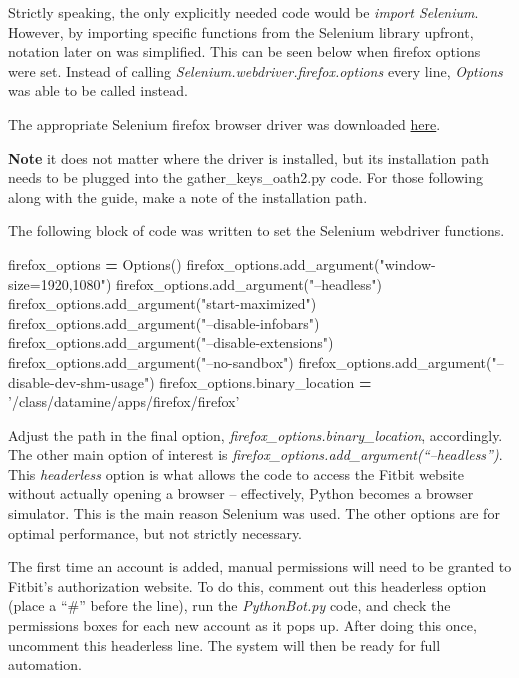 \documentclass[]{book}
\newenvironment{Shaded}{\begin{snugshade}}{\end{snugshade}}
\newcommand{\NormalTok}[1]{#1}
\newcommand{\OperatorTok}[1]{\textcolor[rgb]{0.81,0.36,0.00}{\textbf{#1}}}
\newcommand{\StringTok}[1]{\textcolor[rgb]{0.31,0.60,0.02}{#1}}
\begin{document}
Strictly speaking, the only explicitly needed code would be \emph{import Selenium}. However, by importing specific functions from the Selenium library upfront, notation later on was simplified. This can be seen below when firefox options were set. Instead of calling \emph{Selenium.webdriver.firefox.options} every line, \emph{Options} was able to be called instead.

The appropriate Selenium firefox browser driver was downloaded \href{https://github.com/mozilla/geckodriver/releases}{here}.

\textbf{Note} it does not matter where the driver is installed, but its installation path needs to be plugged into the gather\_keys\_oath2.py code. For those following along with the guide, make a note of the installation path.

The following block of code was written to set the Selenium webdriver functions.

\begin{Shaded}
\begin{Highlighting}[]
\NormalTok{firefox_options }\OperatorTok{=}\NormalTok{ Options()}
\NormalTok{firefox_options.add_argument(}\StringTok{"window-size=1920,1080"}\NormalTok{)}
\NormalTok{firefox_options.add_argument(}\StringTok{"--headless"}\NormalTok{)}
\NormalTok{firefox_options.add_argument(}\StringTok{"start-maximized"}\NormalTok{)}
\NormalTok{firefox_options.add_argument(}\StringTok{"--disable-infobars"}\NormalTok{)}
\NormalTok{firefox_options.add_argument(}\StringTok{"--disable-extensions"}\NormalTok{)}
\NormalTok{firefox_options.add_argument(}\StringTok{"--no-sandbox"}\NormalTok{)}
\NormalTok{firefox_options.add_argument(}\StringTok{"--disable-dev-shm-usage"}\NormalTok{)}
\NormalTok{firefox_options.binary_location }\OperatorTok{=} \StringTok{'/class/datamine/apps/firefox/firefox'}
\end{Highlighting}
\end{Shaded}

Adjust the path in the final option, \emph{firefox\_options.binary\_location}, accordingly.
The other main option of interest is \emph{firefox\_options.add\_argument(``--headless'')}. This \emph{headerless} option is what allows the code to access the Fitbit website without actually opening a browser -- effectively, Python becomes a browser simulator. This is the main reason Selenium was used. The other options are for optimal performance, but not strictly necessary.

The first time an account is added, manual permissions will need to be granted to Fitbit's authorization website. To do this, comment out this headerless option (place a ``\#'' before the line), run the \emph{PythonBot.py} code, and check the permissions boxes for each new account as it pops up. After doing this once, uncomment this headerless line. The system will then be ready for full automation.
\end{document}
